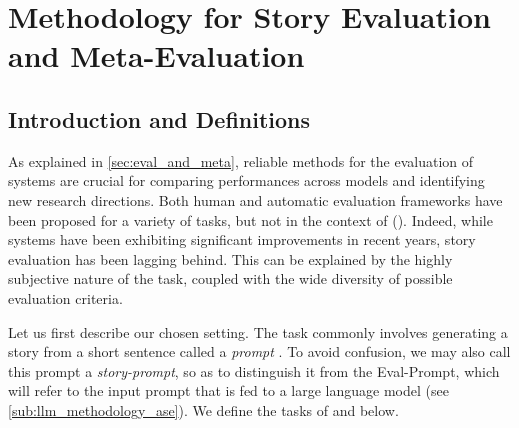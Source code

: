 \chapter{Methodology for Story Evaluation and {\asg} Meta-Evaluation}
\label{chap:methodology_story_evaluation}
\minitoc
\newpage


\section{Introduction and Definitions}
\label{sec:methodology_introduction}

As explained in \autoref{sec:eval_and_meta}, reliable methods for the evaluation of {\nlp} systems are crucial for comparing performances across models and identifying new research directions. Both human and automatic evaluation frameworks have been proposed for a variety of tasks, but not in the context of {\asgfull} (\asg). Indeed, while {\asg} systems have been exhibiting significant improvements in recent years, story evaluation has been lagging behind. This can be explained by the highly subjective nature of the task, coupled with the wide diversity of possible evaluation criteria.

Let us first describe our chosen setting. The {\asg} task commonly involves generating a story from a short sentence called a \textit{prompt} \citep{alabdulkarim2021automatic}. To avoid confusion, we may also call this prompt a \textit{story-prompt}, so as to distinguish it from the Eval-Prompt, which will refer to the input prompt that is fed to a large language model (see \autoref{sub:llm_methodology_ase}). We define the tasks of {\asgfull} and {\asefull} below.

